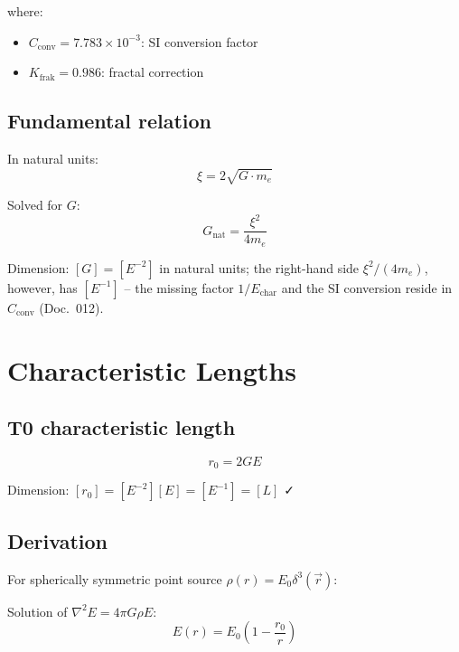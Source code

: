 	where:
	\begin{itemize}
		\item $C_{\text{conv}} = 7.783\times10^{-3}$: SI conversion factor
		\item $K_{\text{frak}} = 0.986$: fractal correction
	\end{itemize}
	
	\subsection{Fundamental relation}
	
	In natural units:
	\begin{equation}
		\xi = 2\sqrt{G \cdot m_e}
	\end{equation}
	
	Solved for $G$:
	\begin{equation}
		G_{\text{nat}} = \frac{\xi^2}{4m_e}
	\end{equation}
	
	Dimension: $[G] = [E^{-2}]$ in natural units; the right-hand side $\xi^2/(4m_e)$, however, has $[E^{-1}]$ -- the missing factor $1/E_{\text{char}}$ and the SI conversion reside in $C_{\text{conv}}$ (Doc.~012).
	
	\section{Characteristic Lengths}
	\label{sec:characteristic_lengths}
	
	\subsection{T0 characteristic length}
	
	\begin{equation}
		r_0 = 2GE
	\end{equation}
	
	Dimension: $[r_0] = [E^{-2}][E] = [E^{-1}] = [L]$ ✓
	
	\subsection{Derivation}
	
	For spherically symmetric point source $\rho(r) = E_0 \delta^3(\vec{r})$:
	
	Solution of $\nabla^2 E = 4\pi G \rho E$:
	\begin{equation}
		E(r) = E_0 \left(1 - \frac{r_0}{r}\right)
	\end{equation}
	
